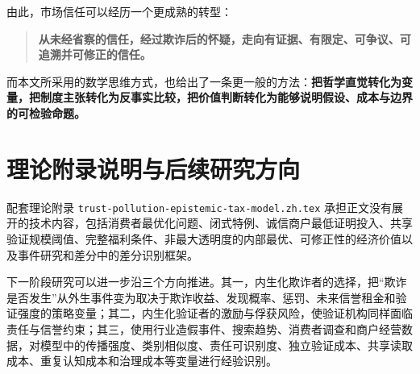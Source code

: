 \documentclass[UTF8,12pt]{ctexart}
\begin{document}
由此，市场信任可以经历一个更成熟的转型：

\begin{quote}
\textbf{从未经省察的信任，经过欺诈后的怀疑，走向有证据、有限定、可争议、可追溯并可修正的信任。}
\end{quote}

而本文所采用的数学思维方式，也给出了一条更一般的方法：\textbf{把哲学直觉转化为变量，把制度主张转化为反事实比较，把价值判断转化为能够说明假设、成本与边界的可检验命题。}

\section*{理论附录说明与后续研究方向}

配套理论附录 \texttt{trust-pollution-epistemic-tax-model.zh.tex} 承担正文没有展开的技术内容，包括消费者最优化问题、闭式特例、诚信商户最低证明投入、共享验证规模阈值、完整福利条件、非最大透明度的内部最优、可修正性的经济价值以及事件研究和差分中的差分识别框架。

下一阶段研究可以进一步沿三个方向推进。其一，内生化欺诈者的选择，把“欺诈是否发生”从外生事件变为取决于欺诈收益、发现概率、惩罚、未来信誉租金和验证强度的策略变量；其二，内生化验证者的激励与俘获风险，使验证机构同样面临责任与信誉约束；其三，使用行业造假事件、搜索趋势、消费者调查和商户经营数据，对模型中的传播强度、类别相似度、责任可识别度、独立验证成本、共享读取成本、重复认知成本和治理成本等变量进行经验识别。



\end{document}
